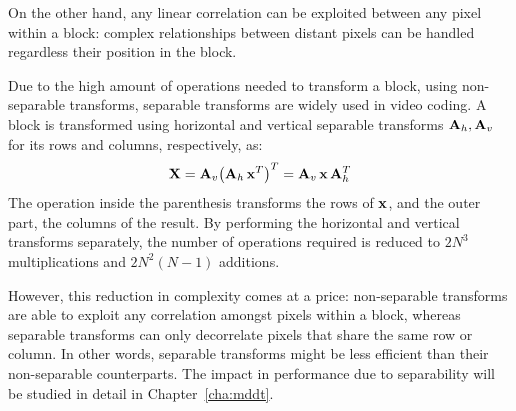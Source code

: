 \documentclass[11pt,a4paper,openright,twoside]{book}
\numberwithin{equation}{section} %
\numberwithin{figure}{section} %
\numberwithin{table}{section} %
\begin{document}
On the other hand, any linear correlation can be exploited between any pixel
within a block:
complex relationships between distant pixels can be handled regardless their
position in the block.

Due to the high amount of operations needed to transform a block, using
non-separable transforms, separable transforms are widely used in video
coding.
A block is transformed using horizontal and vertical separable transforms
$\mathbf{A}_h, \mathbf{A}_v$ for its rows and columns, respectively, as:
\begin{equation}
	\mathbf{X} = \mathbf{A}_v {\left(\mathbf{A}_h \, \mathbf{x}^T\right)}^T = \mathbf{A}_v \, \mathbf{x} \, \mathbf{A}_h^T
	\label{eqn:sep_transform}
\end{equation}
The operation inside the parenthesis transforms the rows of $\mathbf{x}$, and the
outer part, the columns of the result.
By performing the horizontal and vertical transforms separately, the number of
operations required is reduced to $2N^3$ multiplications and $2N^2(N-1)$
additions.

However, this reduction in complexity comes at a price:
non-separable transforms are able to exploit any correlation amongst pixels
within a block, whereas separable transforms can only decorrelate pixels that
share the same row or column.
In other words, separable transforms might be less efficient than their
non-separable counterparts.
The impact in performance due to separability will be studied in detail
in Chapter~\ref{cha:mddt}.
\end{document}
